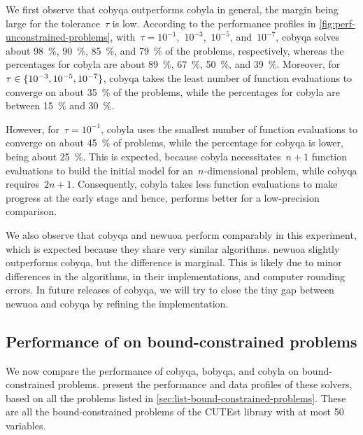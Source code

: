 We first observe that \gls{cobyqa} outperforms \gls{cobyla} in general, the margin being large for the tolerance~$\tau$ is low.
According to the performance profiles in \cref{fig:perf-unconstrained-problems}, with~$\tau = 10^{-1}$,~$10^{-3}$,~$10^{-5}$, and~$10^{-7}$, \gls{cobyqa} solves about \SI{98}{\percent}, \SI{90}{\percent}, \SI{85}{\percent}, and \SI{79}{\percent} of the problems, respectively, whereas the percentages for \gls{cobyla} are about \SI{89}{\percent}, \SI{67}{\percent}, \SI{50}{\percent}, and \SI{39}{\percent}.
Moreover, for~$\tau \in \{10^{-3}, 10^{-5}, 10^{-7}\}$, \gls{cobyqa} takes the least number of function evaluations to converge on about \SI{35}{\percent} of the problems, while the percentages for \gls{cobyla} are between \SI{15}{\percent} and \SI{30}{\percent}. 

However, for~$\tau = 10^{-1}$, \gls{cobyla} uses the smallest number of function evaluations to converge on about \SI{45}{\percent} of problems, while the percentage for \gls{cobyqa} is lower, being about \SI{25}{\percent}.
This is expected, because \gls{cobyla} necessitates~$n + 1$ function evaluations to build the initial model for an~$n$-dimensional problem, while \gls{cobyqa} requires~$2n + 1$.
Consequently, \gls{cobyla} takes less function evaluations to make progress at the early stage and hence, performs better for a low-precision comparison.

We also observe that \gls{cobyqa} and \gls{newuoa} perform comparably in this experiment, which is expected because they share very similar algorithms.
\Gls{newuoa} slightly outperforms \gls{cobyqa}, but the difference is marginal.
This is likely due to minor differences in the algorithms, in their implementations, and computer rounding errors.
In future releases of \gls{cobyqa}, we will try to close the tiny gap between \gls{newuoa} and \gls{cobyqa} by refining the implementation.

\subsection{Performance of  on bound-constrained problems}

We now compare the performance of \gls{cobyqa}, \gls{bobyqa}, and \gls{cobyla} on bound-constrained problems.
 present the performance and data profiles of these solvers, based on all the problems listed in \cref{sec:list-bound-constrained-problems}.
These are all the bound-constrained problems of the CUTEst library with at most \num{50} variables.

